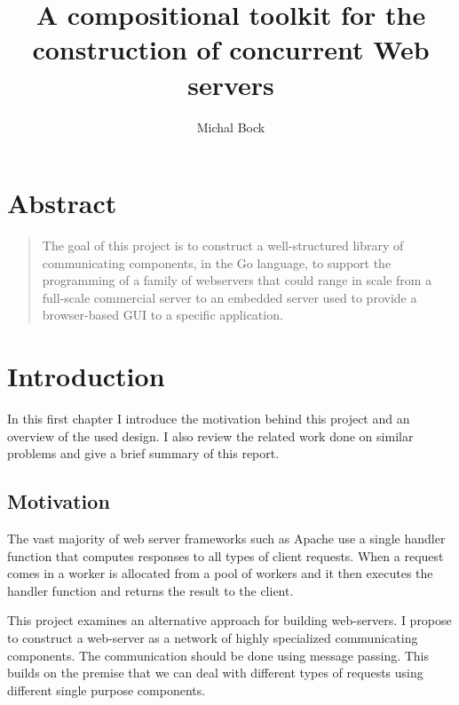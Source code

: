 \documentclass[12pt,a4paper]{article}
\title{A compositional toolkit for the construction of concurrent Web servers}
\author{Michal Bock}
\date{}
\begin{document}
\maketitle
\thispagestyle{empty}


\newpage
{}
\section*{Abstract}
\begin{quote}
The goal of this project is to construct a well-structured
library of communicating components, in the Go language, to support
the programming of a family of webservers that could range in scale 
from a full-scale commercial server to an embedded server used to provide 
a browser-based GUI to a specific application.
\end{quote}

\newpage
\tableofcontents

\newpage
\section{Introduction}
In this first chapter I introduce the motivation behind this project and 
an overview of the used design. I also review the related work done on similar
problems and give a brief summary of this report. 

\subsection{Motivation}
The vast majority of web server frameworks such as Apache
use a single handler function that
computes responses to all types of client requests. When a request comes in a 
worker is allocated from a pool of workers and it then executes the handler function
and returns the result to the client.

This project examines an alternative approach for building web-servers. 
I propose to construct a web-server as a network of highly specialized 
communicating components. The communication should be done using
message passing. This builds on the premise that we can deal
with different types of requests using different single purpose components.
\end{document}
